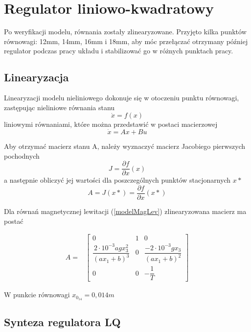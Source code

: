 \section{Regulator liniowo-kwadratowy}

Po weryfikacji modelu, równania zostały zlinearyzowane. Przyjęto kilka punktów równowagi: 12mm, 14mm, 16mm i 18mm, aby móc przełączać otrzymany później regulator podczas pracy układu i stabilizować go w różnych punktach pracy.

\subsection{Linearyzacja}

Linearyzacji modelu nieliniowego dokonuje się w otoczeniu punktu równowagi, zastępując nieliniowe równania stanu
\begin{equation}
\dot{x} = f(x)
\end{equation}
liniowymi równaniami, które można przedstawić w postaci macierzowej
\begin{equation}
\dot{x} = Ax + Bu
\end{equation}

Aby otrzymać macierz stanu A, należy wyznaczyć macierz Jacobiego pierwszych pochodnych
\begin{equation}
J = \dfrac{\partial f}{\partial x}(x)
\end{equation}
a następnie obliczyć jej wartości dla poszczególnych punktów stacjonarnych $x*$
\begin{equation}
A = J(x*) = \dfrac{\partial f}{\partial x}(x*)
\end{equation}

Dla równań magnetycznej lewitacji (\ref{modelMagLev}) zlinearyzowana macierz ma postać

\[
\begin{array}{lc}
A = &
\begin{bmatrix} 0 & 1 & 0 \\ \dfrac{2 \cdot 10^{-3} agx_3^2}{(ax_1+b)^3} & 0 & \dfrac{-2 \cdot 10^{-3} gx_3}{(ax_1+b)^2} \\ 0 & 0 & -\dfrac{1}{T}
\end{bmatrix}
\end{array}
\]

W punkcie równowagi $ x_{0_{14}} = 0,014 m $

\subsection{Synteza regulatora LQ}


